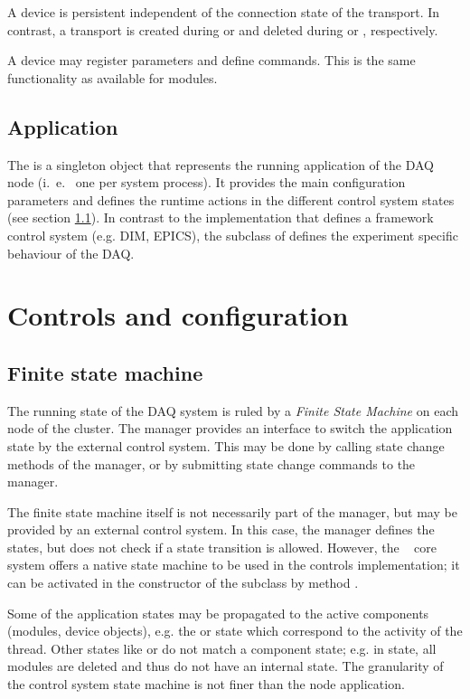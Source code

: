 A device is persistent independent of the connection state 
of the transport. In contrast, a transport is created 
during  or 
and deleted during  or , respectively. 

A device may register parameters and define 
commands. This is the same functionality as available for modules.   


\subsection{Application}
The  
is a singleton object that represents the running application of the DAQ node 
(i.~e.~ one per system process). It provides the main configuration parameters
and defines the runtime actions in the different control system states (see section \ref{prog_fsm}).
In contrast to the  implementation that defines a framework control system (e.g. DIM, EPICS), the subclass of  defines the experiment specific behaviour of the DAQ.


               
\section{Controls and configuration}
\subsection{Finite state machine}
\label{prog_fsm}

The running state of the DAQ system is ruled by a {\sl Finite State Machine} 
\cite{Wikipedia-Statemachine} 
on  each node of the cluster. The manager provides an interface to switch the application 
state by the external control system. This may be done by calling 
state change methods of the manager, or by submitting state change commands 
to the manager.

The finite state machine itself is not necessarily part of the manager,
but may be provided by an external control system. In this case,
the manager defines the states, but does not check if a state transition is allowed. 
However, the \dabc~ core system offers a native state machine to be used
in the controls implementation; it can be
activated in the constructor of the  subclass 
by method .      
      
Some of the application states may be propagated to the 
active components (modules, device objects), e.g. the 
 or  state which correspond to the activity of the thread. 
Other states like  or  do not match a component state; 
e.g. in  state, all modules are deleted and thus do not 
have an internal state. The granularity of the control system state 
machine is not finer than the node application.


